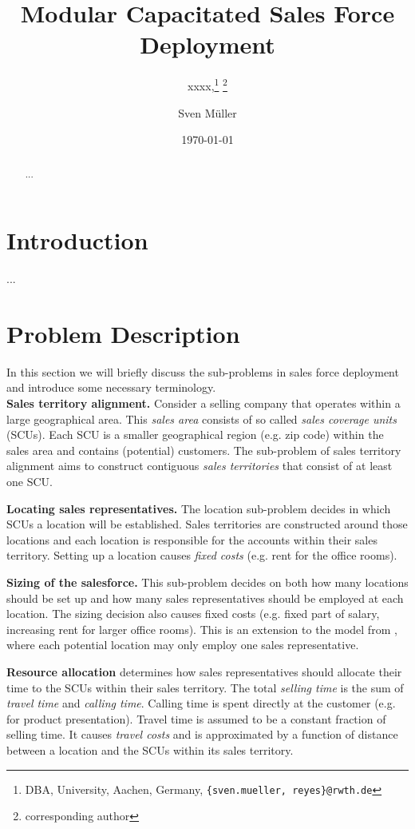\documentclass[12pt]{scrartcl}
\title{Modular Capacitated Sales Force Deployment}
\author{xxxx,\thanks{DBA,  University, Aachen, Germany, \texttt{\{sven.mueller, reyes\}@rwth.de}} \thanks{corresponding author} \and
        Sven M\"uller\footnotemark[1] }
\date{\today}
\begin{document}
\maketitle

\begin{abstract}

...

\end{abstract}

\section{Introduction} \label{Introduction}

...

\section{Problem Description} \label{Problem Description}

In this section we will briefly discuss the sub-problems in sales force deployment and introduce some necessary terminology. \\

\textbf{Sales territory alignment.} Consider a selling company that operates within a large geographical area. This \emph{sales area} consists of so called \emph{sales coverage units} (SCUs). Each SCU is a smaller geographical region (e.g. zip code) within the sales area and contains (potential) customers. The sub-problem of sales territory alignment aims to construct contiguous \emph{sales territories} that consist of at least one SCU.

\textbf{Locating sales representatives.} The location sub-problem decides in which SCUs a location will be established. Sales territories are constructed around those locations and each location is responsible for the accounts within their sales territory. Setting up a location causes \emph{fixed costs} (e.g. rent for the office rooms).

\textbf{Sizing of the salesforce.} This sub-problem decides on both how many locations should be set up and how many sales representatives should be employed at each location. The sizing decision also causes fixed costs (e.g. fixed part of salary, increasing rent for larger office rooms). This is an extension to the model from \cite{Haase2014}, where each potential location may only employ one sales representative.

\textbf{Resource allocation} determines how sales representatives should allocate their time to the SCUs within their sales territory. The total \emph{selling time} is the sum of \emph{travel time} and \emph{calling time}. Calling time is spent directly at the customer (e.g. for product presentation). Travel time is assumed to be a constant fraction of selling time. It causes \emph{travel costs} and is approximated by a function of distance between a location and the SCUs within its sales territory.
\end{document}
